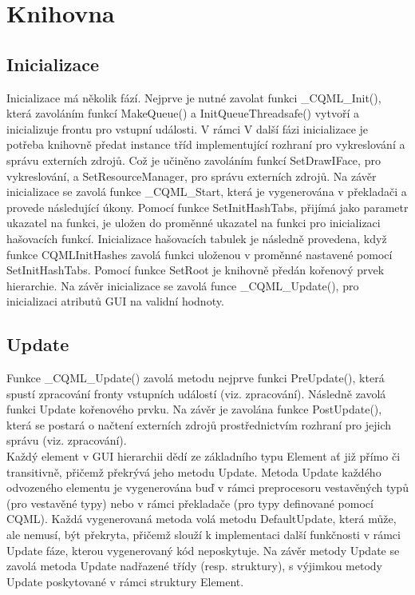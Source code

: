 \documentclass[report,11pt]{elsarticle}
\begin{document}
\section{\label{SEC:aa}Knihovna}


\subsection{Inicializace}
Inicializace má několik fází. Nejprve je nutné zavolat funkci \_CQML\_Init(), která zavoláním funkcí MakeQueue() a InitQueueThreadsafe() vytvoří a inicializuje frontu pro vstupní události. V rámci
V další fázi inicializace je potřeba knihovně předat instance tříd implementující rozhraní pro vykreslování a správu externích zdrojů. Což je učiněno zavoláním funkcí SetDrawIFace, pro vykreslování, a SetResourceManager, pro správu externích zdrojů.
Na závěr inicializace se zavolá funkce \_CQML\_Start, která je vygenerována v překladači a provede následující úkony.
Pomocí funkce SetInitHashTabs, přijímá jako parametr ukazatel na funkci, je uložen do proměnné ukazatel na funkci pro inicializaci hašovacích funkcí. Inicializace hašovacích tabulek je následně provedena, když funkce CQMLInitHashes zavolá funkci uloženou v proměnné nastavené pomocí SetInitHashTabs.
Pomocí funkce SetRoot je knihovně předán kořenový prvek hierarchie. Na závěr inicializace se zavolá funce \_CQML\_Update(), pro inicializaci atributů GUI na validní hodnoty.	

\subsection{Update}
Funkce \_CQML\_Update() zavolá metodu nejprve funkci PreUpdate(), která spustí zpracování fronty vstupních událostí (viz. zpracování). Následně zavolá funkci Update kořenového prvku. Na závěr je zavolána funkce PostUpdate(), která se postará o načtení externích zdrojů prostřednictvím rozhraní pro jejich správu (viz. zpracování).\\
Každý element v GUI hierarchii dědí ze základního typu Element ať již přímo či transitivně, přičemž překrývá jeho metodu Update. Metoda Update každého odvozeného elementu je vygenerována buď v rámci preprocesoru vestavěných typů (pro vestavěné typy) nebo v rámci překladače (pro typy definované pomocí CQML). Každá vygenerovaná metoda volá metodu DefaultUpdate, která může, ale nemusí, být překryta, přičemž slouží k implementaci další funkčnosti v rámci Update fáze, kterou vygenerovaný kód neposkytuje. Na závěr metody Update se zavolá metoda Update nadřazené třídy (resp. struktury), s výjimkou metody Update poskytované v rámci struktury Element.\\
\end{document}
